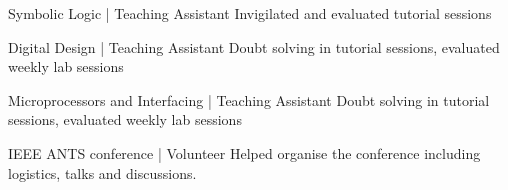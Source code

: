 \begin{projects}

\projecta
	{Symbolic Logic | Teaching Assistant}{} {}
	{Invigilated and evaluated tutorial sessions}
	
 \projecta
	{Digital Design | Teaching Assistant}{} {}
	{Doubt solving in tutorial sessions, evaluated weekly lab sessions}
	
\projecta
	{Microprocessors and Interfacing | Teaching Assistant}{} {}
	{Doubt solving in tutorial sessions, evaluated weekly lab sessions}
	
\projecta
	{IEEE ANTS conference | Volunteer}{} {}
	{Helped organise the conference including logistics, talks and discussions. }
 \end{projects}
 \vspace{-3mm}
 
 